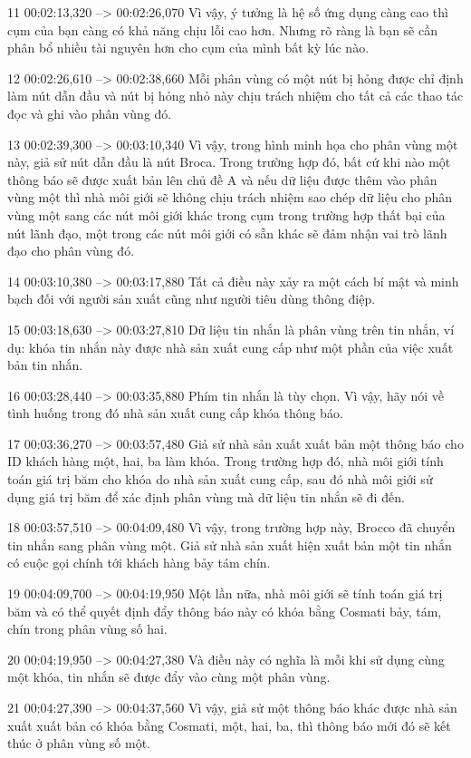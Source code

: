 11
00:02:13,320 --> 00:02:26,070
Vì vậy, ý tưởng là hệ số ứng dụng càng cao thì cụm của bạn càng có khả năng chịu lỗi cao hơn.  Nhưng rõ ràng là bạn sẽ cần phân bổ nhiều tài nguyên hơn cho cụm của mình bất kỳ lúc nào.

12
00:02:26,610 --> 00:02:38,660
Mỗi phân vùng có một nút bị hỏng được chỉ định làm nút dẫn đầu và nút bị hỏng nhỏ này chịu trách nhiệm cho tất cả các thao tác đọc và ghi vào phân vùng đó.

13
00:02:39,300 --> 00:03:10,340
Vì vậy, trong hình minh họa cho phân vùng một này, giả sử nút dẫn đầu là nút Broca.  Trong trường hợp đó, bất cứ khi nào một thông báo sẽ được xuất bản lên chủ đề A và nếu dữ liệu được thêm vào phân vùng một thì nhà môi giới sẽ không chịu trách nhiệm sao chép dữ liệu cho phân vùng một sang các nút môi giới khác trong cụm trong trường hợp thất bại  của nút lãnh đạo, một trong các nút môi giới có sẵn khác sẽ đảm nhận vai trò lãnh đạo cho phân vùng đó.

14
00:03:10,380 --> 00:03:17,880
Tất cả điều này xảy ra một cách bí mật và minh bạch đối với người sản xuất cũng như người tiêu dùng thông điệp.

15
00:03:18,630 --> 00:03:27,810
Dữ liệu tin nhắn là phân vùng trên tin nhắn, ví dụ:  khóa tin nhắn này được nhà sản xuất cung cấp như một phần của việc xuất bản tin nhắn.

16
00:03:28,440 --> 00:03:35,880
Phím tin nhắn là tùy chọn.  Vì vậy, hãy nói về tình huống trong đó nhà sản xuất cung cấp khóa thông báo.

17
00:03:36,270 --> 00:03:57,480
Giả sử nhà sản xuất xuất bản một thông báo cho ID khách hàng một, hai, ba làm khóa.  Trong trường hợp đó, nhà môi giới tính toán giá trị băm cho khóa do nhà sản xuất cung cấp, sau đó nhà môi giới sử dụng giá trị băm để xác định phân vùng mà dữ liệu tin nhắn sẽ đi đến.

18
00:03:57,510 --> 00:04:09,480
Vì vậy, trong trường hợp này, Brocco đã chuyển tin nhắn sang phân vùng một.  Giả sử nhà sản xuất hiện xuất bản một tin nhắn có cuộc gọi chính tới khách hàng bảy tám chín.

19
00:04:09,700 --> 00:04:19,950
Một lần nữa, nhà môi giới sẽ tính toán giá trị băm và có thể quyết định đẩy thông báo này có khóa bằng Cosmati bảy, tám, chín trong phân vùng số hai.

20
00:04:19,950 --> 00:04:27,380
Và điều này có nghĩa là mỗi khi sử dụng cùng một khóa, tin nhắn sẽ được đẩy vào cùng một phân vùng.

21
00:04:27,390 --> 00:04:37,560
Vì vậy, giả sử một thông báo khác được nhà sản xuất xuất bản có khóa bằng Cosmati, một, hai, ba, thì thông báo mới đó sẽ kết thúc ở phân vùng số một.

